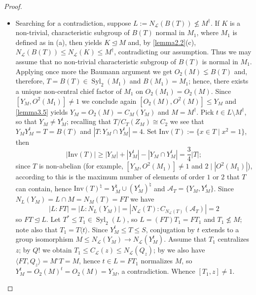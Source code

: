 \documentclass{amsart}
\numberwithin{equation}{section}
\theoremstyle{definition}
\theoremstyle{subresult}
\theoremstyle{caseresult}
\newcommand{\A}{\mathcal{A}}
\renewcommand{\L}{\mathcal{L}}
\newcommand{\Syl}{\operatorname{Syl}}
\newcommand{\norm}{\trianglelefteq}
\newcommand{\fto}{\longrightarrow}
\newcommand{\<}{\langle}
\renewcommand{\>}{\rangle}
\begin{document}
\begin{proof}
\begin{itemize}
		\item[(b)] Searching for a contradiction, suppose $L:=N_\L(B(T)) \not \le M^\dagger$. If $K$ is a non-trivial, characteristic subgroup of $B(T)$ normal in $M_1$, where $M_1$ is defined as in (a), then \cite[Lemma 3.4(h)]{Meier-Stell-Stroth:2012} yields $K \norm M$ and, by \ref{lemma2.2}(c), $N_\L(B(T)) \le N_\L(K) \le M^\dagger$, contradicting our assumption. Thus we may assume that no non-trivial characteristic subgroup of $B(T)$ is normal in $M_1$.\\
        Applying once more the Baumann argument we get $O_2(M) \lneq B(T)$ and, therefore, $T=B(T) \in \Syl_2(M_1)$ and $B(M_1)=M_1$; hence, there exists a unique non-central chief factor of $M_1$ on $O_2(M_1)=O_2(M)$. Since $[Y_M,O^2(M_1)] \ne 1$ we conclude again $[O_2(M),O^2(M)] \le Y_M$ and \ref{lemma3.5} yields $Y_M=O_2(M)=C_M(Y_M)$ and $M = M^\dagger$. Pick $t \in L \setminus M^\dagger$, so that $Y_M \ne Y_M^t$; recalling that $T/C_T(Z_M) \cong C_2$ we see that $Y_MY_M^t =T=B(T)$ and $|T : Y_M \cap Y_M^t|=4$. Set $\mathrm{Inv}(T) := \{x \in T \mid x^2=1 \}$, then
        \[
        | \mathrm{Inv}(T) | \ge |Y_M| + |Y_M^t| - |Y_M \cap Y_M^t| = \frac{3}{4}|T|;
        \]
        since $T$ is non-abelian (for example, $[Y_M,O^2(M_1)] \ne 1$ and $2 \mid |O^2(M_1)|$), according to \cite[Theorem 4.1]{Edmonds-Norwood:2009} this is the maximum number of elements of order $1$ or $2$ that $T$ can contain, hence $\mathrm{Inv}(T)^\natural = Y_M^\natural \cup (Y_M^t)^\natural$ and $\A_T=\{Y_M,Y_M^t\}$. Since $N_L(Y_M) = L \cap M = N_M(T) = FT$ we have
        \[
        |L:FT| = |L:N_L(Y_M)| = |N_\L(T):C_{N_\L(T)}(\mathcal{A}_T)| =2
        \]
        so $FT \norm L$. Let $T^* \le T_1 \in \Syl_2(L)$, so $L=(FT)T_1=FT_1$ and $T_1 \not \le M$; note also that $T_1 = T\<t\>$. Since $Y_M^t \le T \le S$, conjugation by $t$ extends to a group isomorphism $M \le N_\L(Y_M) \fto N_\L(Y_M^t)$. Assume that $T_1$ centralizes $z$; by $Q!$ we obtain $T_1 \le C_\L(z) \le N_\L(Q_z)$; by \cite[Lemmas 3.4(i) and 3.3(e)(i)]{Meier-Stell-Stroth:2012} we also have $\<FT,Q_z\> = M^\circ T = M$, hence $t \in L = FT_1$ normalizes $M$, so $Y_M^t = O_2(M)^t = O_2(M) = Y_M$, a contradiction. Whence $[T_1,z] \ne 1$.\\

\end{itemize}
\end{proof}
\end{document}
